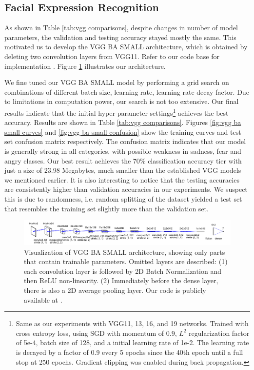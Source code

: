 \documentclass{article}
\begin{document}
\subsection{Facial Expression Recognition}
As shown in Table \ref{tab:vgg comparisons}, despite changes in number of model parameters, the validation and testing accuracy stayed mostly the same. This motivated us to develop the VGG BA SMALL architecture, which is obtained by deleting two convolution layers from VGG11. Refer to our code base for implementation \cite{code}. Figure \ref{fig:architecture vgg ba small} illustrates our architecture. 

We fine tuned our VGG BA SMALL model by performing a grid search on combinations of different batch size, learning rate, learning rate decay factor. Due to limitations in computation power, our search is not too extensive. Our final results indicate that the initial hyper-parameter settings\footnote{Same as our experiments with VGG11, 13, 16, and 19 networks. Trained with cross entropy loss, using SGD with momentum of 0.9, $L^2$ regularization factor of 5e-4, batch size of 128, and a initial learning rate of 1e-2. The learning rate is decayed by a factor of 0.9 every 5 epochs since the 40th epoch until a full stop at 250 epochs. Gradient clipping was enabled during back propagation.} achieves the best accuracy. Results are shown in Table \ref{tab:vgg comparisons}. Figures \ref{fig:vgg ba small curves} and \ref{fig:vgg ba small confusion} show the training curves and test set confusion matrix respectively. The confusion matrix indicates that our model is generally strong in all categories, with possible weakness in sadness, fear and angry classes. Our best result achieves the 70\% classification accuracy tier with just a size of 23.98 Megabytes, much smaller than the established VGG models we mentioned earlier. It is also interesting to notice that the testing accuracies are consistently higher than validation accuracies in our experiments. We suspect this is due to randomness, i.e. random splitting of the dataset yielded a test set that resembles the training set slightly more than the validation set.
\begin{figure}[]
    \centering
    \includegraphics[width=\textwidth]{figs/VGG_BA_SMALL.pdf}
    \caption{Visualization of VGG BA SMALL architecture, showing only parts that contain trainable parameters. Omitted layers are described: (1) each convolution layer is followed by 2D Batch Normalization and then ReLU non-linearity. (2) Immediately before the dense layer, there is also a 2D average pooling layer. Our code is publicly available at \cite{code}.}
    \label{fig:architecture vgg ba small}
\end{figure}
\end{document}
